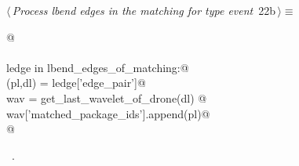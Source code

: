 \documentclass[10pt, english, oneside]{report}
\begin{document}
\begin{flushleft} \small
\begin{minipage}{\linewidth}\label{scrap25}\raggedright\small
{} $\langle\,${\itshape Process lbend edges in the matching for type  event}\nobreak\ {\footnotesize {22b}}$\,\rangle\equiv$
\vspace{-1ex}
\begin{list}{}{} \item
\mbox{}\verb@   @\\
\mbox{}\verb@@\\
\mbox{}\verb@for ledge in lbend_edges_of_matching:@\\
\mbox{}\verb@    (pl,dl) = ledge['edge_pair']@\\
\mbox{}\verb@    wav     = get_last_wavelet_of_drone(dl)     @\\
\mbox{}\verb@    wav['matched_package_ids'].append(pl)@\\
\mbox{}\verb@    @\\
\mbox{}\verb@@{\NWsep}
\end{list}
\vspace{-1.5ex}
\footnotesize
\begin{list}{}{\setlength{\itemsep}{-\parsep}\setlength{\itemindent}{-\leftmargin}}
\item \NWtxtMacroRefIn\ .

\item{}
\end{list}
\end{minipage}\vspace{4ex}
\end{flushleft}
\end{document}
